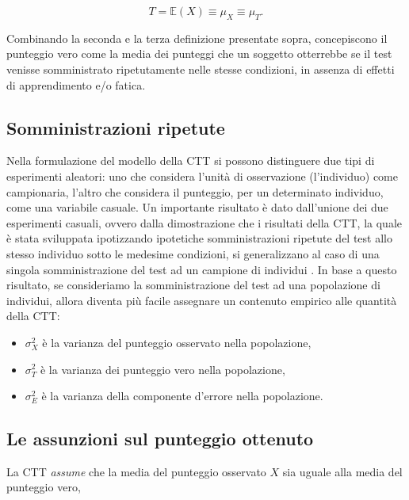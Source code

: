\documentclass[
  11pt,
]{krantz}
\providecommand{\tightlist}{%
  \setlength{\itemsep}{0pt}\setlength{\parskip}{0pt}}
\newcommand{\E}{\mathbb{E}} %
\theoremstyle{definition}
\theoremstyle{definition}
\theoremstyle{definition}
\theoremstyle{definition}
\theoremstyle{remark}
\begin{document}
\[
T = \E(X) \equiv \mu_X \equiv \mu_{T}.
\]

Combinando la seconda e la terza definizione presentate sopra, \citet{lord1968statistical} concepiscono il punteggio vero come la media dei punteggi che un soggetto otterrebbe se il test venisse somministrato ripetutamente nelle stesse condizioni, in assenza di effetti di apprendimento e/o fatica.

\hypertarget{somministrazioni-ripetute}{%
\subsection{Somministrazioni ripetute}\label{somministrazioni-ripetute}}

Nella formulazione del modello della CTT si possono distinguere due tipi di esperimenti aleatori: uno che considera l'unità di osservazione (l'individuo) come campionaria, l'altro che considera il punteggio, per un determinato individuo, come una variabile casuale. Un importante risultato è dato dall'unione dei due esperimenti casuali, ovvero dalla dimostrazione che i risultati della CTT, la quale è stata sviluppata ipotizzando ipotetiche somministrazioni ripetute del test allo stesso individuo sotto le medesime condizioni, si generalizzano al caso di una singola somministrazione del test ad un campione di individui \citep{allen2001introduction}. In base a questo risultato, se consideriamo la somministrazione del test ad una popolazione di individui, allora diventa più facile assegnare un contenuto empirico alle quantità della CTT:

\begin{itemize}
\tightlist
\item
  \(\sigma^2_X\) è la varianza del punteggio osservato nella popolazione,
\item
  \(\sigma^2_T\) è la varianza dei punteggio vero nella popolazione,
\item
  \(\sigma^2_E\) è la varianza della componente d'errore nella popolazione.
\end{itemize}

\hypertarget{le-assunzioni-sul-punteggio-ottenuto}{%
\subsection{Le assunzioni sul punteggio ottenuto}\label{le-assunzioni-sul-punteggio-ottenuto}}

La CTT \emph{assume} che la media del punteggio osservato \(X\) sia uguale alla media del punteggio vero,
\end{document}

